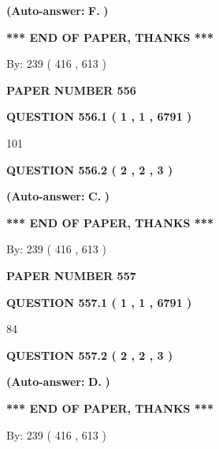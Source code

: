 \documentclass[12pt]{article}
\begin{document}
 
{\textbf{(Auto-answer:}}
{\textbf{\large{
F.}}}
{\textbf{)}}
 
 
   
   
   
   
\vspace{1.0in} 
{\textbf{\large{ *** END OF PAPER, THANKS *** }}} 
   
   
\hspace{1.0in} By: 
 239 ( 416 ,  613 )
   
   
   
   
\newpage 
\setcounter{page}{ 
   556001 } 
   
   
 {\textbf{ \Large{ PAPER NUMBER  556  }}}
   
   
   
   
  
  
{\textbf{\large{QUESTION
556.1 
 ( 1 , 1 , 6791 )
}}}

101
  
  
{\textbf{\large{QUESTION
556.2 
 ( 2 , 2 , 3 )
}}}
 
 
{\textbf{(Auto-answer:}}
{\textbf{\large{
C.}}}
{\textbf{)}}
 
 
   
   
   
   
\vspace{1.0in} 
{\textbf{\large{ *** END OF PAPER, THANKS *** }}} 
   
   
\hspace{1.0in} By: 
 239 ( 416 ,  613 )
   
   
   
   
\newpage 
\setcounter{page}{ 
   557001 } 
   
   
 {\textbf{ \Large{ PAPER NUMBER  557  }}}
   
   
   
   
  
  
{\textbf{\large{QUESTION
557.1 
 ( 1 , 1 , 6791 )
}}}

84
  
  
{\textbf{\large{QUESTION
557.2 
 ( 2 , 2 , 3 )
}}}
 
 
{\textbf{(Auto-answer:}}
{\textbf{\large{
D.}}}
{\textbf{)}}
 
 
   
   
   
   
\vspace{1.0in} 
{\textbf{\large{ *** END OF PAPER, THANKS *** }}} 
   
   
\hspace{1.0in} By: 
 239 ( 416 ,  613 )
   
   
   
\end{document}
